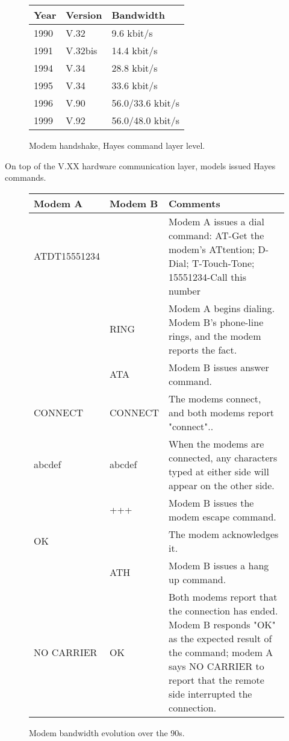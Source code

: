  \begin{figure}[H]
\centering  
\begin{tabularx}{\textwidth}{ L{0.2} L{0.3} L{0.5}}
  \toprule
  \textbf{Year} & \textbf{Version} & \textbf{Bandwidth} \\
  \toprule 
   
    1990 & V.32 & 9.6 kbit/s \\
    1991 & V.32bis &  14.4 kbit/s \\
    1994 & V.34 & 28.8 kbit/s \\
    1995 & V.34 & 33.6 kbit/s \\
    1996 & V.90 & 56.0/33.6 kbit/s\\
    1999 & V.92 & 56.0/48.0 kbit/s\\
   
   \toprule
\end{tabularx}
\caption{Modem handshake, Hayes command layer level.}
\end{figure}



\par
On top of the V.XX hardware communication layer, models issued Hayes commands.\\

\par
 \begin{figure}[H]
\centering  
\begin{tabularx}{\textwidth}{ L{0.2} L{0.15} L{0.65}}
  \toprule
  \textbf{Modem A} & \textbf{Modem B} & \textbf{Comments} \\
  \toprule 
   
    ATDT15551234 &	&	Modem A issues a dial command: AT-Get the modem's ATtention; D-Dial; T-Touch-Tone; 15551234-Call this number\\
    \toprule 
      & RING	& Modem A begins dialing. Modem B's phone-line rings, and the modem reports the fact.\\
      \toprule 
    & ATA	& Modem B issues answer command.\\
    \toprule 
    CONNECT	& CONNECT	& The modems connect, and both modems report "connect"..\\
    abcdef	& abcdef	& When the modems are connected, any characters typed at either side will appear on the other side.\\
    \toprule 
    & +++	& Modem B issues the modem escape command.\\
    \toprule 
     OK &	& The modem acknowledges it.\\
    \toprule 
    & ATH	& Modem B issues a hang up command.\\
    \toprule 
    NO CARRIER &	OK	& Both modems report that the connection has ended. Modem B responds "OK" as the expected result of the command; modem A says NO CARRIER to report that the remote side interrupted the connection.\\
   \toprule
\end{tabularx}
\caption{Modem bandwidth evolution over the 90s.}
\end{figure}
\par
{}